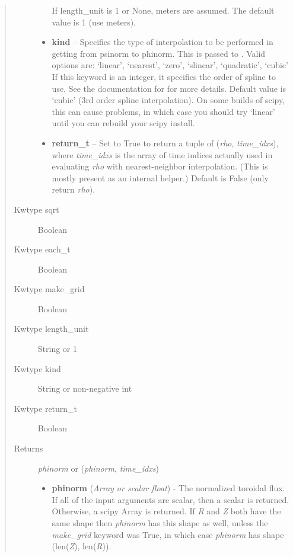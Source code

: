\documentclass[letterpaper,10pt,english]{sphinxmanual}
\begin{document}
\begin{fulllineitems}
\begin{fulllineitems}
\begin{quote}
\begin{description}
\begin{itemize}
\begin{quote}
\end{quote}

If length\_unit is 1 or None, meters are assumed. The default
value is 1 (use meters).


\item {} 
\textbf{kind} -- Specifies the type of
interpolation to be performed in getting from psinorm to
phinorm. This is passed to
. Valid options are:
`linear', `nearest', `zero', `slinear', `quadratic', `cubic'
If this keyword is an integer, it specifies the order of spline
to use. See the documentation for  for more
details. Default value is `cubic' (3rd order spline
interpolation). On some builds of scipy, this can cause problems,
in which case you should try `linear' until you can rebuild your
scipy install.

\item {} 
\textbf{return\_t} -- Set to True to return a tuple of (\emph{rho},
\emph{time\_idxs}), where \emph{time\_idxs} is the array of time indices
actually used in evaluating \emph{rho} with nearest-neighbor
interpolation. (This is mostly present as an internal helper.)
Default is False (only return \emph{rho}).

\end{itemize}

\item[{Kwtype sqrt}] \leavevmode
Boolean

\item[{Kwtype each\_t}] \leavevmode
Boolean

\item[{Kwtype make\_grid}] \leavevmode
Boolean

\item[{Kwtype length\_unit}] \leavevmode
String or 1

\item[{Kwtype kind}] \leavevmode
String or non-negative int

\item[{Kwtype return\_t}] \leavevmode
Boolean

\item[{Returns}] \leavevmode

\emph{phinorm} or (\emph{phinorm}, \emph{time\_idxs})
\begin{itemize}
\item {} 
\textbf{phinorm} (\emph{Array or scalar float}) - The normalized toroidal
flux. If all of the input arguments are scalar, then a scalar is
returned. Otherwise, a scipy Array is returned. If \emph{R} and \emph{Z}
both have the same shape then \emph{phinorm} has this shape as well,
unless the \emph{make\_grid} keyword was True, in which case \emph{phinorm}
has shape (len(\emph{Z}), len(\emph{R})).


\end{itemize}
\end{description}
\end{quote}
\end{fulllineitems}
\end{fulllineitems}
\end{document}
